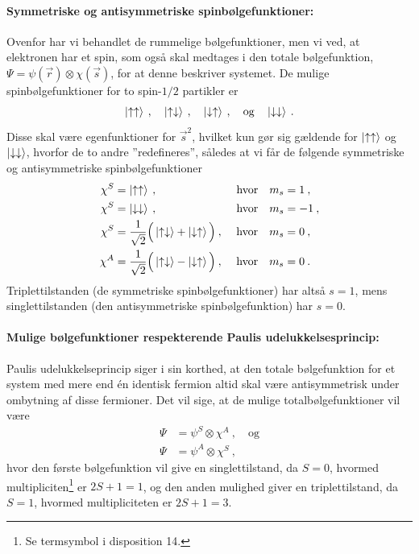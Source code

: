 \paragraph{Symmetriske og antisymmetriske spinbølgefunktioner:} Ovenfor har vi behandlet de rummelige bølgefunktioner, men vi ved, at elektronen har et spin, som også skal medtages i den totale bølgefunktion, $\Psi = \psi(\Vec{r}) \otimes \chi(\Vec{s})$, for at denne beskriver systemet. De mulige spinbølgefunktioner for to spin-$1/2$ partikler er
\begin{align}
    \ket{\uparrow\uparrow} \: , \quad \ket{\uparrow\downarrow} \: , \quad \ket{\downarrow\uparrow} \: , \quad \text{og} \quad \ket{\downarrow\downarrow} \: .
\end{align}
Disse skal være egenfunktioner for $\Vec{s}^2$, hvilket kun gør sig gældende for $\ket{\uparrow\uparrow}$ og $\ket{\downarrow\downarrow}$, hvorfor de to andre ''redefineres'', således at vi får de følgende symmetriske og antisymmetriske spinbølgefunktioner
\begin{align}
    \chi^S &= \ket{\uparrow\uparrow} \: , \qquad \qquad \qquad \quad \text{hvor} \quad m_s = 1 \: , \\
    \chi^S &= \ket{\downarrow\downarrow} \: , \qquad \qquad \qquad \quad \text{hvor} \quad m_s = -1 \: , \\
    \chi^S &= \frac{1}{\sqrt{2}} \Big(\ket{\uparrow\downarrow} + \ket{\downarrow\uparrow}\Big) \: , \,\quad \text{hvor} \quad m_s = 0 \: , \\
    \chi^A &= \frac{1}{\sqrt{2}} \Big(\ket{\uparrow\downarrow} - \ket{\downarrow\uparrow}\Big) \: , \,\quad \text{hvor} \quad m_s = 0 \: .
\end{align}
Triplettilstanden (de symmetriske spinbølgefunktioner) har altså $s = 1$, mens singlettilstanden (den antisymmetriske spinbølgefunktion) har $s = 0$.


\paragraph{Mulige bølgefunktioner respekterende Paulis udelukkelsesprincip:} Paulis udelukkelseprincip siger i sin korthed, at den totale bølgefunktion for et system med mere end én identisk fermion altid skal være antisymmetrisk under ombytning af disse fermioner. Det vil sige, at de mulige totalbølgefunktioner vil være
\begin{align}
    \Psi &= \psi^S \otimes \chi^A \: , \quad \text{og} \\
    \Psi &= \psi^A \otimes \chi^S \: ,
\end{align}
hvor den første bølgefunktion vil give en singlettilstand, da $S = 0$, hvormed multipliciten\footnote{Se termsymbol i disposition 14.} er $2S + 1 = 1$, og den anden mulighed giver en triplettilstand, da $S = 1$, hvormed multipliciteten er $2S + 1 = 3$.

